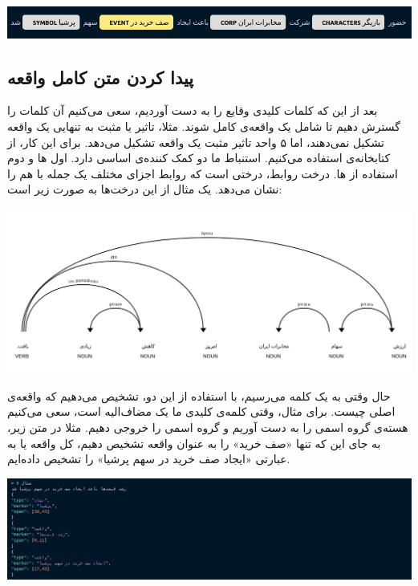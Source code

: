 \documentclass[a4paper,12pt]{article}
\begin{document}
\begin{center}
	\includegraphics[scale=0.5]{images/NE.png}
\end{center}





\subsection*{پیدا کردن متن کامل واقعه}

بعد از این که کلمات کلیدی وقایع را به دست آوردیم،‌ سعی می‌کنیم آن کلمات را گسترش دهیم 
تا شامل یک واقعه‌ی کامل شوند. مثلا، تاثیر یا مثبت به تنهایی یک واقعه تشکیل نمی‌دهند، اما ۵ واحد تاثیر 
مثبت یک واقعه تشکیل می‌دهد. برای این کار، از کتابخانه‌ی
استفاده می‌کنیم. استنباط ما دو کمک کننده‌ی اساسی دارد. اول
ها
 و دوم استفاده از 
ها. 
درخت روابط، درختی است که روابط اجزای مختلف یک جمله با هم را نشان می‌دهد. یک مثال از این 
درخت‌ها به صورت زیر است: 

\begin{center}
	\includegraphics[scale=0.3]{images/DEP.png}
\end{center}


حال وقتی به یک کلمه‌ می‌رسیم، با استفاده از این دو، تشخیص می‌دهیم که واقعه‌ی اصلی چیست. 
برای مثال، وقتی کلمه‌ی کلیدی ما یک مضاف‌الیه است، سعی می‌کنیم هسته‌ی گروه اسمی را به دست 
آوریم و گروه اسمی را خروجی دهیم. مثلا در متن زیر، به جای این که تنها «صف خرید» را 
به عنوان واقعه تشخیص دهیم، کل واقعه یا به عبارتی «ایجاد صف خرید 
در سهم پرشیا» را تشخیص داده‌ایم. 

\begin{center}
	\includegraphics[scale=0.5, trim ={0 0 17cm 0}, clip]{images/8.png}
\end{center}
\end{document}
